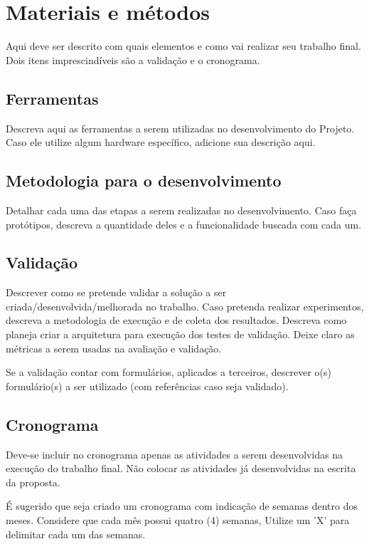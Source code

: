 \chapter{Materiais e métodos}\label{chap:materiais}

Aqui deve ser descrito com quais elementos e como vai realizar seu trabalho final. Dois itens imprescindíveis são a validação e o cronograma.

\section{Ferramentas}
Descreva aqui as ferramentas a serem utilizadas no desenvolvimento do Projeto. Caso ele utilize algum hardware específico, adicione sua descrição aqui.

\section{Metodologia para o desenvolvimento}
Detalhar cada uma das etapas a serem realizadas no desenvolvimento. Caso faça protótipos, descreva a quantidade deles e a funcionalidade buscada com cada um.

\section{Validação}
Descrever como se pretende validar a solução a ser criada/desenvolvida/melhorada no trabalho. Caso pretenda realizar experimentos, descreva a metodologia de execução e de coleta dos resultados. Descreva como planeja criar a arquitetura para execução dos testes de validação. Deixe claro as métricas a serem usadas na avaliação e validação.

Se a validação contar com formulários, aplicados a terceiros, descrever o(s) formulário(s) a ser utilizado (com referências caso seja validado).

\section{Cronograma}\label{sec:cronograma}

Deve-se incluir no cronograma apenas as atividades a serem desenvolvidas na execução do trabalho final. Não colocar as atividades já desenvolvidas na escrita da proposta.

É sugerido que seja criado um cronograma com indicação de semanas dentro dos meses. Considere que cada mês possui quatro (4) semanas, Utilize um 'X' para delimitar cada um das semanas.

